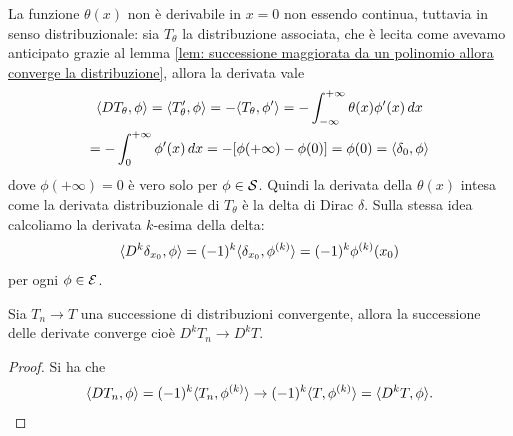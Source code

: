 La funzione $ \theta(x) $ non è derivabile in $ x = 0 $ non essendo continua, tuttavia in senso distribuzionale: sia $ T_{\theta} $ la distribuzione 
associata, che è lecita come avevamo anticipato grazie al lemma \ref{lem: successione maggiorata da un polinomio allora converge la distribuzione},
allora la derivata vale
\begin{gather}
  \sc{DT_\theta, \phi} = \sc{T_\theta', \phi} = -\sc{T_\theta, \phi'} = - \int_{-\infty}^{+ \infty} \theta(x) \phi'(x)\,dx 
  \\
  = - \int_0^{+ \infty} \phi'(x)\,dx = -[\phi(+\infty) - \phi(0)] = \phi (0) = \sc{\delta_0, \phi}
\end{gather}
dove $ \phi(+\infty) = 0 $ è vero solo per $ \phi \in \S $. 
Quindi la derivata della $ \theta(x) $ intesa come la derivata distribuzionale di $ T_\theta $ è la delta di Dirac $ \delta $.
Sulla stessa idea calcoliamo la derivata $ k $-esima della delta: 
\begin{align}
  \sc{D^k\delta_{x_0}, \phi} = (-1)^k \sc{\delta_{x_0}, \phi^{(k)}} = (-1)^k \phi^{(k)}(x_0)
\end{align}
per ogni $ \phi \in \E $.

\begin{theorem} \label{thm: l'operatore derivata è un operatore continuo}
  Sia $ T_n \to T $ una successione di distribuzioni convergente, allora la successione delle derivate converge cioè $ D^kT_n \to D^k T $.
\end{theorem}
\begin{proof}
  Si ha che 
  \begin{align}
    \sc{DT_n, \phi} = (-1)^k \sc{T_n, \phi^{(k)}} \to (-1)^k \sc{T, \phi^{(k)}} = \sc{D^k T, \phi}.
  \end{align}
\end{proof}

